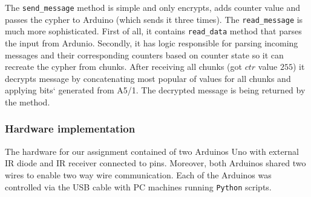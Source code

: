  The \texttt{send\_message} method is simple and only encrypts, adds counter value and passes the cypher to Arduino (which sends it three times). The \texttt{read\_message} is much more sophisticated. First of all, it contains \texttt{read\_data} method that parses the input from Ardunio. Secondly, it has logic responsible for parsing incoming messages and their corresponding counters based on counter state so it can recreate the cypher from chunks. After receiving all chunks (got $ctr$ value $255$) it decrypts message by concatenating most popular of values for all chunks and applying bits` generated from A5/1. The decrypted message is being returned by the method.



 \subsubsection{Hardware implementation}
The hardware for our assignment contained of two Arduinos Uno with external IR diode and IR receiver connected to pins. Moreover, both Arduinos shared two wires to enable two way wire communication. Each of the Arduinos was controlled via the USB cable with PC machines running \texttt{Python} scripts.

